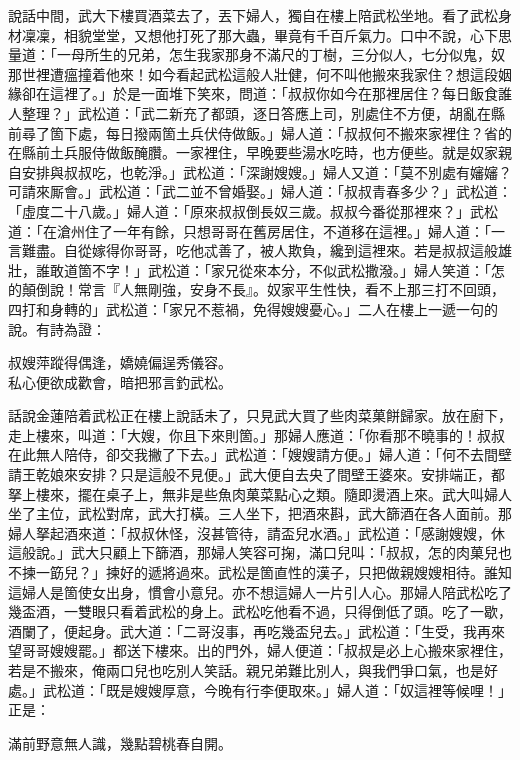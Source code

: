 說話中間，武大下樓買酒菜去了，丟下婦人，獨自在樓上陪武松坐地。看了武松身材凜凜，相貌堂堂，{}又想他打死了那大蟲，畢竟有千百斤氣力。{}口中不說，心下思量道：「一母所生的兄弟，怎生我家那身不滿尺的丁樹，三分似人，七分似鬼，奴那世裡遭瘟撞着他來！如今看起武松這般人壯健，何不叫他搬來我家住？想這段姻緣卻在這裡了。」{}於是一面堆下笑來，問道：「叔叔你如今在那裡居住？每日飯食誰人整理？」武松道：「武二新充了都頭，逐日答應上司，別處住不方便，胡亂在縣前尋了箇下處，每日撥兩箇土兵伏侍做飯。」婦人道：「叔叔何不搬來家裡住？省的在縣前土兵服侍做飯醃臢。一家裡住，早晚要些湯水吃時，也方便些。就是奴家親自安排與叔叔吃，也乾淨。」武松道：「深謝嫂嫂。」婦人又道：「莫不別處有嬸嬸？{}可請來厮會。」武松道：「武二並不曾婚娶。」婦人道：「叔叔青春多少？」武松道：「虛度二十八歲。」婦人道：「原來叔叔倒長奴三歲。叔叔今番從那裡來？」武松道：「在滄州住了一年有餘，只想哥哥在舊房居住，不道移在這裡。」婦人道：「一言難盡。自從嫁得你哥哥，吃他忒善了，被人欺負，纔到這裡來。若是叔叔這般雄壯，{}誰敢道箇不字！」武松道：「家兄從來本分，不似武松撒潑。」{}婦人笑道：「怎的顛倒說！常言『人無剛強，安身不長』。奴家平生性快，看不上那三打不回頭，四打和身轉的」武松道：「家兄不惹禍，免得嫂嫂憂心。」二人在樓上一遞一句的說。有詩為證：

\begin{myquote}
叔嫂萍蹤得偶逢，嬌嬈偏逞秀儀容。\\
私心便欲成歡會，暗把邪言釣武松。
\end{myquote}

話說金蓮陪着武松正在樓上說話未了，只見武大買了些肉菜菓餅歸家。放在廚下，走上樓來，叫道：「大嫂，你且下來則箇。」那婦人應道：「你看那不曉事的！叔叔在此無人陪侍，卻交我撇了下去。」{}武松道：「嫂嫂請方便。」婦人道：「何不去間壁請王乾娘來安排？{}只是這般不見便。」武大便自去央了間壁王婆來。安排端正，都拏上樓來，擺在桌子上，無非是些魚肉菓菜點心之類。隨即燙酒上來。武大叫婦人坐了主位，武松對席，武大打橫。三人坐下，把酒來斟，武大篩酒在各人面前。那婦人拏起酒來道：「叔叔休怪，沒甚管待，請盃兒水酒。」武松道：「感謝嫂嫂，休這般說。」武大只顧上下篩酒，那婦人笑容可掬，滿口兒叫：「叔叔，怎的肉菓兒也不揀一筯兒？」{}揀好的遞將過來。武松是箇直性的漢子，只把做親嫂嫂相待。誰知這婦人是箇使女出身，慣會小意兒。亦不想這婦人一片引人心。那婦人陪武松吃了幾盃酒，一雙眼只看着武松的身上。武松吃他看不過，只得倒低了頭。{}吃了一歇，酒闌了，便起身。武大道：「二哥沒事，再吃幾盃兒去。」武松道：「生受，我再來望哥哥嫂嫂罷。」都送下樓來。出的門外，婦人便道：「叔叔是必上心搬來家裡住，若是不搬來，俺兩口兒也吃別人笑話。親兄弟難比別人，與我們爭口氣，也是好處。」{}武松道：「既是嫂嫂厚意，今晚有行李便取來。」婦人道：「奴這裡等候哩！」正是：

\begin{myquote}
滿前野意無人識，幾點碧桃春自開。
\end{myquote}

